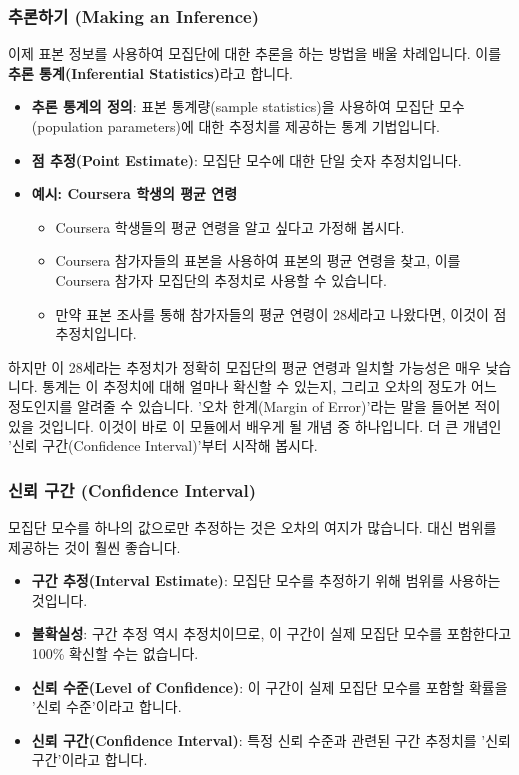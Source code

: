 \documentclass[11pt,a4paper]{article}
\begin{document}
\subsubsection*{추론하기 (Making an Inference)}
이제 표본 정보를 사용하여 모집단에 대한 추론을 하는 방법을 배울 차례입니다. 이를 \textbf{추론 통계(Inferential Statistics)}라고 합니다.

\begin{itemize}
    \item \textbf{추론 통계의 정의}: 표본 통계량(sample statistics)을 사용하여 모집단 모수(population parameters)에 대한 추정치를 제공하는 통계 기법입니다.
    \item \textbf{점 추정(Point Estimate)}: 모집단 모수에 대한 단일 숫자 추정치입니다.
    \item \textbf{예시: Coursera 학생의 평균 연령}
    \begin{itemize}
        \item Coursera 학생들의 평균 연령을 알고 싶다고 가정해 봅시다.
        \item Coursera 참가자들의 표본을 사용하여 표본의 평균 연령을 찾고, 이를 Coursera 참가자 모집단의 추정치로 사용할 수 있습니다.
        \item 만약 표본 조사를 통해 참가자들의 평균 연령이 28세라고 나왔다면, 이것이 점 추정치입니다.
    \end{itemize}
\end{itemize}

하지만 이 28세라는 추정치가 정확히 모집단의 평균 연령과 일치할 가능성은 매우 낮습니다. 통계는 이 추정치에 대해 얼마나 확신할 수 있는지, 그리고 오차의 정도가 어느 정도인지를 알려줄 수 있습니다. '오차 한계(Margin of Error)'라는 말을 들어본 적이 있을 것입니다. 이것이 바로 이 모듈에서 배우게 될 개념 중 하나입니다. 더 큰 개념인 '신뢰 구간(Confidence Interval)'부터 시작해 봅시다.

\subsubsection*{신뢰 구간 (Confidence Interval)}
모집단 모수를 하나의 값으로만 추정하는 것은 오차의 여지가 많습니다. 대신 범위를 제공하는 것이 훨씬 좋습니다.

\begin{itemize}
    \item \textbf{구간 추정(Interval Estimate)}: 모집단 모수를 추정하기 위해 범위를 사용하는 것입니다.
    \item \textbf{불확실성}: 구간 추정 역시 추정치이므로, 이 구간이 실제 모집단 모수를 포함한다고 100\% 확신할 수는 없습니다.
    \item \textbf{신뢰 수준(Level of Confidence)}: 이 구간이 실제 모집단 모수를 포함할 확률을 '신뢰 수준'이라고 합니다.
    \item \textbf{신뢰 구간(Confidence Interval)}: 특정 신뢰 수준과 관련된 구간 추정치를 '신뢰 구간'이라고 합니다.
\end{itemize}
\end{document}

